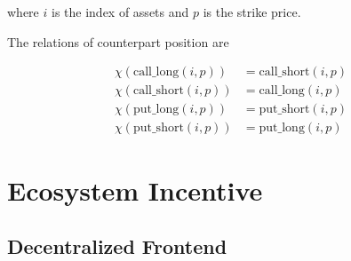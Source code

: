 \documentclass[dvipdfmx]{jsarticle}
\begin{document}
where $i$ is the index of assets and $p$ is the strike price.

The relations of counterpart position are

$$
\begin{aligned}
  \chi(\text{call\_long}(i, p)) & = \text{call\_short}(i, p) \\
  \chi(\text{call\_short}(i, p)) & = \text{call\_long}(i, p) \\
  \chi(\text{put\_long}(i, p)) & = \text{put\_short}(i, p) \\
  \chi(\text{put\_short}(i, p)) & = \text{put\_long}(i, p)
\end{aligned}
$$

\section{Ecosystem Incentive}

\subsection{Decentralized Frontend}
\end{document}
